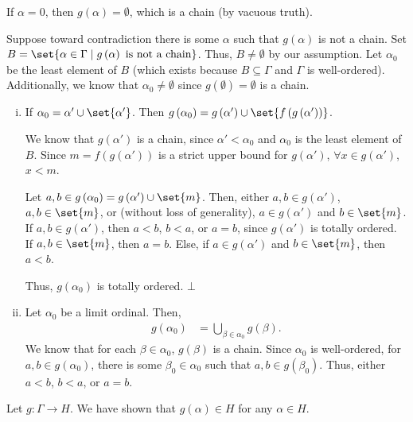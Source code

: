 \documentclass[12pt]{mypackage}
\begin{document}
\begin{solution}
  If $\alpha = 0$, then $g(\alpha) = \emptyset$, which is a chain (by vacuous truth).\newline

  Suppose toward contradiction there is some $\alpha$ such that $g\left(\alpha\right)$ is not a chain. Set $B = \set{\alpha\in \Gamma\mid g\left(\alpha\right)\text{ is not a chain}}$. Thus, $B\neq\emptyset$ by our assumption. Let $\alpha_0$ be the least element of $B$ (which exists because $B\subseteq \Gamma$ and $\Gamma$ is well-ordered). Additionally, we know that $\alpha_0\neq\emptyset$ since $g\left(\emptyset\right) = \emptyset$ is a chain.
  \begin{enumerate}[(i)]
    \item If $\alpha_0 = \alpha' \cup \set{\alpha'}$. Then $g\left(\alpha_0\right) = g\left(\alpha'\right) \cup \set{f\left(g\left(\alpha'\right)\right)}$.\newline

      We know that $g\left(\alpha'\right)$ is a chain, since $\alpha' < \alpha_0$ and $\alpha_0$ is the least element of $B$. Since $m = f\left(g\left(\alpha'\right)\right)$ is a strict upper bound for $g\left(\alpha'\right)$, $\forall x\in g\left(\alpha'\right)$, $x < m$.\newline

      Let $a,b\in g\left(\alpha_0\right) = g\left(\alpha'\right)\cup \set{m}$. Then, either $a,b\in g\left(\alpha'\right)$, $a,b\in \set{m}$, or (without loss of generality), $a\in g\left(\alpha'\right)$ and $b\in \set{m}$. If $a,b\in g\left(\alpha'\right)$, then $a < b$, $b < a$, or $a = b$, since $g\left(\alpha'\right)$ is totally ordered. If $a,b\in \set{m}$, then $a=b$. Else, if $a\in g\left(\alpha'\right)$ and $b\in \set{m}$, then $a < b$.\newline

      Thus, $g\left(\alpha_0\right)$ is totally ordered. $\bot$
    \item Let $\alpha_0$ be a limit ordinal. Then,
      \begin{align*}
        g\left(\alpha_0\right) &= \bigcup_{\beta \in \alpha_0} g\left(\beta\right).
      \end{align*}
      We know that for each $\beta\in \alpha_0$, $g(\beta)$ is a chain. Since $\alpha_0$ is well-ordered, for $a,b\in g\left(\alpha_0\right)$, there is some $\beta_0\in \alpha_0$ such that $a,b\in g\left(\beta_0\right)$. Thus, either $a < b$, $b < a$, or $a = b$.
  \end{enumerate}
  Let $g: \Gamma \rightarrow H$. We have shown that $g(\alpha) \in H$ for any $\alpha \in H$.\newline


\end{solution}
\end{document}
